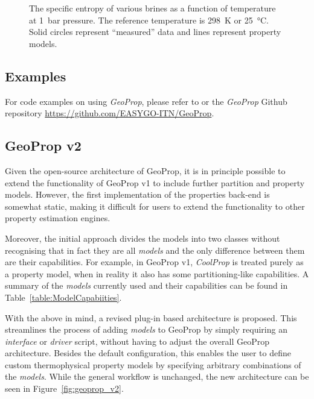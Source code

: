     \begin{figure}[H]
        \centering
        
        \caption[The specific entropy of various brines as a function of temperature at \qty{1}{\bar} pressure.]{The specific entropy of various brines as a function of temperature at \qty{1}{\bar} pressure. The reference temperature is \qty{298}{\K} or \qty{25}{\degreeCelsius}. Solid circles represent “measured” data and lines represent property models.}
        \label{fig:geoprop_entropy_validation}
    \end{figure}

\subsection{Examples}
\label{sec:tppm_geoprop_examples}
    For code examples on using \emph{GeoProp}, please refer to  or the \emph{GeoProp} Github repository \url{https://github.com/EASYGO-ITN/GeoProp}.

\subsection{GeoProp v2}
\label{sec:tppm_geoprop_v2}
    Given the open-source architecture of GeoProp, it is in principle possible to extend the functionality of GeoProp v1 to include further partition and property models. However, the first implementation of the properties back-end is somewhat static, making it difficult for users to extend the functionality to other property estimation engines.

    Moreover, the initial approach divides the models into two classes without recognising that in fact they are all \emph{models} and the only difference between them are their capabilities. For example, in GeoProp v1, \emph{CoolProp} is treated purely as a property model, when in reality it also has some partitioning-like capabilities. A summary of the \emph{models} currently used and their capabilities can be found in Table~\ref{table:ModelCapabiities}.

    With the above in mind, a revised plug-in based architecture is proposed. This streamlines the process of adding \emph{models} to GeoProp by simply requiring an \emph{interface} or \emph{driver} script, without having to adjust the overall GeoProp architecture. Besides the default configuration, this enables the user to define custom thermophysical property models by specifying arbitrary combinations of the \emph{models}. While the general workflow is unchanged, the new architecture can be seen in Figure~\ref{fig:geoprop_v2}.

